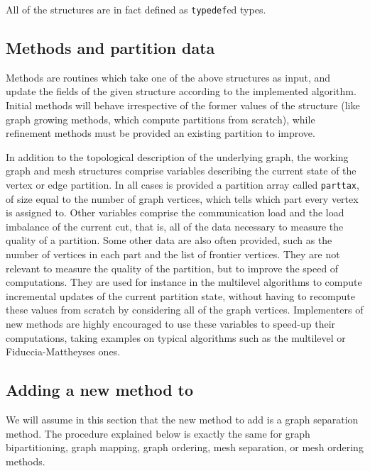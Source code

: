 All of the structures are in fact defined as {\tt typedef}ed types.

\subsection{Methods and partition data}

Methods are routines which take one of the above structures as input,
and update the fields of the given structure according to the
implemented algorithm. Initial methods will behave irrespective of the
former values of the structure (like graph growing methods, which
compute partitions from scratch), while refinement methods must be
provided an existing partition to improve.

In addition to the topological description of the underlying graph,
the working graph and mesh structures comprise variables describing
the current state of the vertex or edge partition. In all cases is
provided a partition array called {\tt parttax}, of size equal to the
number of graph vertices, which tells which part every vertex is
assigned to. Other variables comprise the communication load and the
load imbalance of the current cut, that is, all of the data necessary
to measure the quality of a partition. Some other data are also often
provided, such as the number of vertices in each part and the list of
frontier vertices. They are not relevant to measure the quality of
the partition, but to improve the speed of computations. They are used
for instance in the multilevel algorithms to compute incremental
updates of the current partition state, without having to recompute
these values from scratch by considering all of the graph vertices.
Implementers of new methods are highly encouraged to use these
variables to speed-up their computations, taking examples on typical
algorithms such as the multilevel or Fiduccia-Mattheyses ones.

\subsection{Adding a new method to \scotch}

We will assume in this section that the new method to add is a graph
separation method. The procedure explained below is exactly the same
for graph bipartitioning, graph mapping, graph ordering, mesh
separation, or mesh ordering methods.


